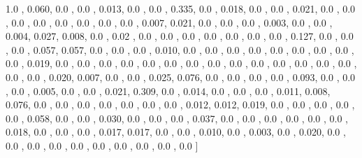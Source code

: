 \documentclass[usenames,dvipsnames]{article} %
\begin{document}
1.0  , 0.060, 0.0  , 0.0  , 0.013, 0.0  , 0.0  , 0.335, 0.0  , 0.018, 0.0  , 0.0  , 0.021, 0.0  , 0.0  , 0.0  , 0.0  , 0.0  , 0.0  , 0.0  , 0.0  , 0.007, 0.021, 0.0  , 0.0  , 0.0  , 0.003, 0.0  , 0.0  , 0.004, 0.027, 0.008, 0.0  , 0.02 , 0.0  , 0.0  , 0.0  , 0.0  , 0.0  , 0.0  , 0.0  , 0.127, 0.0  , 0.0  , 0.0  , 0.057, 0.057, 0.0  , 0.0  , 0.0  , 0.010, 0.0  , 0.0  , 0.0  , 0.0  , 0.0  , 0.0  , 0.0  , 0.0  , 0.0  , 0.019, 0.0  , 0.0  , 0.0  , 0.0  , 0.0  , 0.0  , 0.0  , 0.0  , 0.0  , 0.0  , 0.0  , 0.0  , 0.0  , 0.0  , 0.0  , 0.0  , 0.020, 0.007, 0.0  , 0.0  , 0.025, 0.076, 0.0  , 0.0  , 0.0  , 0.0  , 0.093, 0.0  , 0.0  , 0.0  , 0.005, 0.0  , 0.0  , 0.021, 0.309, 0.0  , 0.014, 0.0  , 0.0  , 0.0  , 0.011, 0.008, 0.076, 0.0  , 0.0  , 0.0  , 0.0  , 0.0  , 0.0  , 0.0  , 0.012, 0.012, 0.019, 0.0  , 0.0  , 0.0  , 0.0  , 0.0  , 0.058, 0.0  , 0.0  , 0.030, 0.0  , 0.0  , 0.0  , 0.037, 0.0  , 0.0  , 0.0  , 0.0  , 0.0  , 0.0  , 0.018, 0.0  , 0.0  , 0.0  , 0.017, 0.017, 0.0  , 0.0  , 0.010, 0.0  , 0.003, 0.0  , 0.020, 0.0  , 0.0  , 0.0  , 0.0  , 0.0  , 0.0  , 0.0  , 0.0  , 0.0  , 0.0  ]
\end{document}
